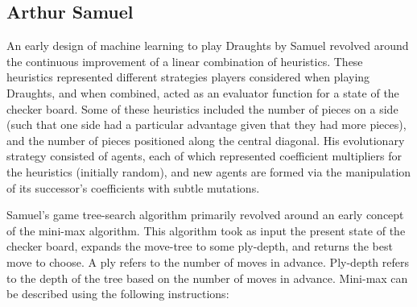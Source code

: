 \documentclass[12pt,a4paper]{article}
\begin{document}

    \subsection{Arthur Samuel}
        An early design of machine learning to play Draughts by Samuel \cite{samuel_studies_1959} revolved around the continuous improvement of a linear combination of heuristics. These heuristics represented different strategies players considered when playing Draughts, and when combined, acted as an evaluator function for a state of the checker board. Some of these heuristics included the number of pieces on a  side (such that one side had a particular advantage given that they had more pieces), and the number of pieces positioned along the central diagonal. His evolutionary strategy consisted of agents, each of which represented coefficient multipliers for the heuristics (initially random), and new agents are formed via the manipulation of its successor's coefficients with subtle mutations.
        
        
        Samuel's game tree-search algorithm primarily revolved around an early concept of the mini-max algorithm. This algorithm took as input the present state of the checker board, expands the move-tree to some ply-depth, and returns the best move to choose. A ply refers to the number of moves in advance. Ply-depth refers to the depth of the tree based on the number of moves in advance. Mini-max can be described using the following instructions:
        
\end{document}
